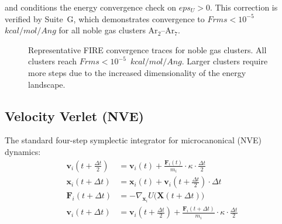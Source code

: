 \documentclass[11pt,twoside]{article}
\def\AA{Ang}%
\def\varepsilon{eps}%
\def\kcalmol{kcal/mol}%
\def\Angstrom{Ang}%
\def\Frms{Frms}%
\newcommand{\Angstrom}{\text{\AA}}
\newcommand{\kcalmol}{\text{kcal/mol}}
\newcommand{\Frms}{F_{\mathrm{rms}}}
\begin{document}
and conditions the energy convergence check on $\varepsilon_U > 0$. This correction is verified by Suite~G, which demonstrates convergence to $\Frms < 10^{-5}$~$\kcalmol/\Angstrom$ for all noble gas clusters Ar$_2$--Ar$_7$.

\begin{figure}[H]
\centering
{}
\caption{Representative FIRE convergence traces for noble gas clusters. All clusters reach $\Frms < 10^{-5}$~$\kcalmol/\Angstrom$. Larger clusters require more steps due to the increased dimensionality of the energy landscape.}
\label{fig:fire-convergence}
\end{figure}

\subsection{Velocity Verlet (NVE)}

The standard four-step symplectic integrator for microcanonical (NVE) dynamics:
\begin{align}
  \mathbf{v}_i\!\left(t + \tfrac{\Delta t}{2}\right) &= \mathbf{v}_i(t) +
    \frac{\mathbf{F}_i(t)}{m_i} \cdot \kappa \cdot \frac{\Delta t}{2} \label{eq:vv1} \\
  \mathbf{x}_i(t + \Delta t) &= \mathbf{x}_i(t) +
    \mathbf{v}_i\!\left(t + \tfrac{\Delta t}{2}\right) \cdot \Delta t \label{eq:vv2} \\
  \mathbf{F}_i(t + \Delta t) &= -\nabla_{\mathbf{x}_i} U\bigl(\mathbf{X}(t+\Delta t)\bigr) \label{eq:vv3} \\
  \mathbf{v}_i(t + \Delta t) &= \mathbf{v}_i\!\left(t + \tfrac{\Delta t}{2}\right) +
    \frac{\mathbf{F}_i(t+\Delta t)}{m_i} \cdot \kappa \cdot \frac{\Delta t}{2} \label{eq:vv4}
\end{align}
\end{document}

